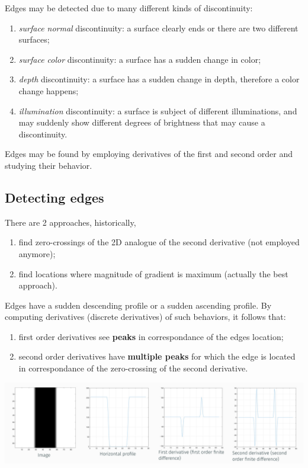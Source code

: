 \documentclass[10pt]{report}
\begin{document}
Edges may be detected due to many different kinds of discontinuity:

\begin{enumerate}
\item \emph{surface normal} discontinuity: a surface clearly ends or there are
two different surfaces;
\item \emph{surface color} discontinuity: a surface has a sudden change in
color;
\item \emph{depth} discontinuity: a surface has a sudden change in depth,
therefore a color change happens;
\item \emph{illumination} discontinuity: a surface is subject of different
illuminations, and may suddenly show different degrees of brightness
that may cause a discontinuity.
\end{enumerate}

Edges may be found by employing derivatives of the first and second
order and studying their behavior.

\subsection{Detecting edges}
\label{detecting-edges}
There are 2 approaches, historically,

\begin{enumerate}
\item find zero-crossings of the 2D analogue of the second derivative (not
employed anymore);
\item find locations where magnitude of gradient is maximum (actually the
best approach).
\end{enumerate}

Edges have a sudden descending profile or a sudden ascending profile. By
computing derivatives (discrete derivatives) of such behaviors, it
follows that:

\begin{enumerate}
\item first order derivatives see \textbf{peaks} in correspondance of the edges
location;
\item second order derivatives have \textbf{multiple peaks} for which the edge is
located in correspondance of the zero-crossing of the second
derivative.
\end{enumerate}

\begin{center}
\includegraphics[width=.9\linewidth]{./pics/det/edges-derivatives.jpg}
\end{center}
\end{document}
